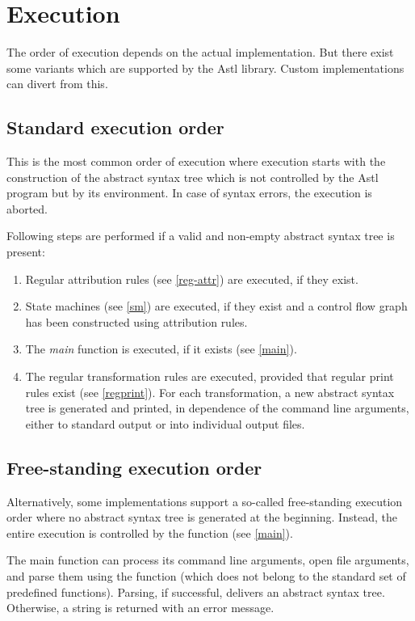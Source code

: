 \chapter{Execution}
The order of execution depends on the actual implementation. But
there exist some variants which are supported by the Astl library.
Custom implementations can divert from this.

\section{Standard execution order}\label{xorder}
This is the most common order of execution where
execution starts with the construction of the abstract syntax tree
which is not controlled by the Astl program but by its environment.
In case of syntax errors, the execution is aborted.

Following steps are performed if a valid and non-empty
abstract syntax tree is present:

\begin{enumerate}
   \item Regular attribution rules (see \ref{reg-attr}) are executed,
      if they exist.
   \item State machines (see \ref{sm}) are executed, if they exist
      and a control flow graph has been constructed using attribution rules.
   \item The \textit{main} function is executed, if it exists
      (see \ref{main}).
   \item The regular transformation rules are executed, provided
      that regular print rules exist (see \ref{regprint}).
      For each transformation, a new abstract syntax tree is generated
      and printed, in dependence of the command line arguments, either
      to standard output or into individual output files.
\end{enumerate}

\section{Free-standing execution order}\label{free-xorder}
Alternatively, some implementations support a so-called free-standing execution
order
where no abstract syntax tree is generated at the
beginning. Instead, the entire execution is controlled by the
 function (see \ref{main}).

The main function can process its command line arguments,
open file arguments, and parse them using the 
function (which does not belong to the standard set of predefined functions).
Parsing, if successful, delivers an abstract syntax tree. Otherwise,
a string is returned with an error message.

